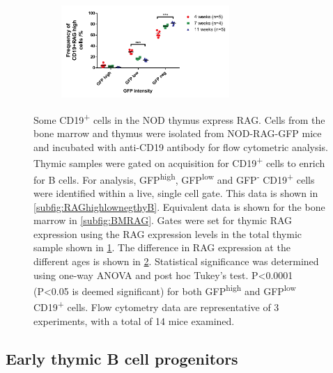 \begin{figure}
\begin{subfigure}{0.5\textwidth}
	\label{subfig:totalthyRAG}
	\end{subfigure}
	\begin{subfigure}{\textwidth}
	\caption{}
	\includegraphics[width=0.7\textwidth]{Figures/RAGhighlownegative.pdf}
	\label{subfig:RAGhighlowneggraph}
	\end{subfigure}
\caption[Some CD19\textsuperscript{+} cells in the NOD thymus express RAG]{Some CD19\textsuperscript{+} cells in the NOD thymus express RAG. 
Cells from the bone marrow and thymus were isolated from NOD-RAG-GFP mice and incubated with anti-CD19 antibody for flow cytometric analysis.
Thymic samples were gated on acquisition for CD19\textsuperscript{+} cells to enrich for B cells.
For analysis, GFP\textsuperscript{high}, GFP\textsuperscript{low} and GFP\textsuperscript{-} CD19\textsuperscript{+} cells were identified within a live, single cell gate. 
This data is shown in \ref{subfig:RAGhighlownegthyB}.
Equivalent data is shown for the bone marrow in \ref{subfig:BMRAG}.
Gates were set for thymic RAG expression using the RAG expression levels in the total thymic sample shown in \ref{subfig:totalthyRAG}.
The difference in RAG expression at the different ages is shown in \ref{subfig:RAGhighlowneggraph}. Statistical significance was determined using one-way ANOVA and post hoc Tukey's test. P<0.0001 (P<0.05 is deemed significant) for both GFP\textsuperscript{high} and GFP\textsuperscript{low} CD19\textsuperscript{+} cells.
Flow cytometry data are representative of 3 experiments, with a total of 14 mice examined.}
\label{fig:GFP}
\end{figure}


\subsection{Early thymic B cell progenitors}
\label{subsec:earlyprogens}



